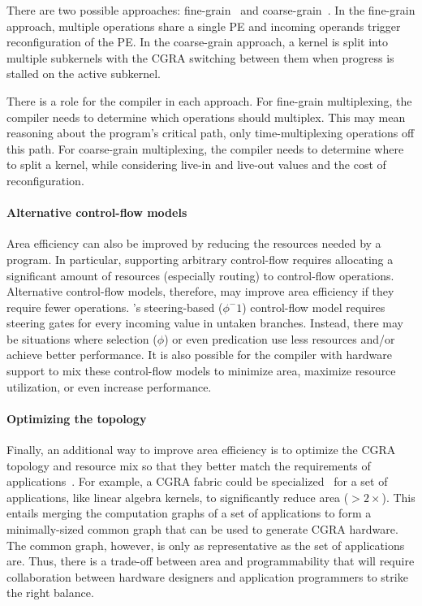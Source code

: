 There are two possible approaches: fine-grain~\cite{weng2020hybrid} and coarse-grain~\cite{nguyen2021fifer}.
% 
In the fine-grain approach, multiple operations share a single PE and incoming operands trigger reconfiguration of the PE.
% 
In the coarse-grain approach, a kernel is split into multiple subkernels with the CGRA switching between them when progress is stalled on the active subkernel.

There is a role for the compiler in each approach.
% 
For fine-grain multiplexing, the compiler needs to determine which operations should multiplex.
% 
This may mean reasoning about the program's critical path, only time-multiplexing operations off this path.
% 
For coarse-grain multiplexing, the compiler needs to determine where to split a kernel, while considering live-in and live-out values and the cost of reconfiguration.

\paragraph{Alternative control-flow models}
Area efficiency can also be improved by reducing the resources needed by a program.
% 
In particular, supporting arbitrary control-flow requires allocating a significant amount of resources (especially routing) to control-flow operations.
% 
Alternative control-flow models, therefore, may improve area efficiency if they require fewer operations.
% 
\riptide's steering-based ($\phi^-1$) control-flow model requires steering gates for every incoming value in untaken branches.
% 
Instead, there may be situations where selection ($\phi$) or even predication use less resources and/or achieve better performance.
% 
It is also possible for the compiler with hardware support to mix these control-flow models to minimize area, maximize resource utilization, or even increase performance.

\paragraph{Optimizing the topology}
Finally, an additional way to improve area efficiency is to optimize the CGRA topology and resource mix so that they better match the requirements of applications~\cite{revamp,melchert2021automated}.
% 
For example, a CGRA fabric could be specialized~\cite{weng2020dsagen} for a set of applications, like linear algebra kernels, to significantly reduce area ($>2\times$).
% 
This entails merging the computation graphs of a set of applications to form a minimally-sized common graph that can be used to generate CGRA hardware.
% 
The common graph, however, is only as representative as the set of applications are.
% 
Thus, there is a trade-off between area and programmability that will require collaboration between hardware designers and application programmers to strike the right balance.

